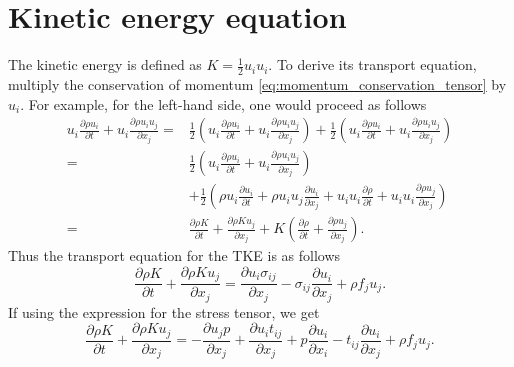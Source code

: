 \documentclass[oneside,a4paper,11pt]{report}
\begin{document}
\section{Kinetic energy equation}
The kinetic energy is defined as $K = \frac{1}{2} u_i u_i$. To derive its transport equation, multiply the conservation of momentum \cref{eq:momentum_conservation_tensor} by $u_i$. For example, for the left-hand side, one would proceed as follows
\begin{align}
u_i \frac{\partial \rho u_i}{\partial t} + u_i \frac{ \partial \rho u_i u_j}{\partial x_j} = &\frac{1}{2} \left ( u_i \frac{\partial \rho u_i}{\partial t} + u_i \frac{ \partial \rho u_i u_j}{\partial x_j} \right ) + \frac{1}{2} \left ( u_i \frac{\partial \rho u_i}{\partial t} + u_i \frac{ \partial \rho u_i u_j}{\partial x_j} \right ) \nonumber \\
= & \frac{1}{2} \left ( u_i \frac{\partial \rho u_i}{\partial t} + u_i \frac{ \partial \rho u_i u_j}{\partial x_j} \right ) \nonumber \\
& + \frac{1}{2} \left ( \rho u_i \frac{ \partial u_i}{\partial t} + \rho u_i u_j \frac{ \partial u_i}{\partial x_j} + u_i u_i \frac{\partial \rho}{\partial t} + u_i u_i \frac{\partial \rho u_j}{\partial x_j} \right ) \nonumber \\
= & \frac{\partial \rho K}{\partial t} + \frac{\partial \rho K u_j}{\partial x_j} + K \left ( \frac{\partial \rho}{\partial t} + \frac{\partial \rho u_j}{\partial x_j} \right ).
\end{align}
Thus the transport equation for the TKE is as follows 
\begin{equation}
    \frac{\partial \rho K}{\partial t} + \frac{\partial \rho K u_j}{\partial x_j} = \frac{\partial u_i \sigma_{ij}}{\partial x_j} - \sigma_{ij} \frac{\partial u_i}{\partial x_j} + \rho f_j u_j .
\end{equation}
If using the expression for the stress tensor, we get
\begin{equation}
    \label{eq:kinetic_energy}
    \frac{\partial \rho K}{\partial t} + \frac{\partial \rho K u_j}{\partial x_j} = - \frac{\partial u_j p}{\partial x_j} + \frac{\partial u_i t_{ij}}{\partial x_j} + p \frac{\partial u_i}{\partial x_i} - t_{ij} \frac{\partial u_i}{\partial x_j} + \rho f_j u_j .
\end{equation}

\end{document}
